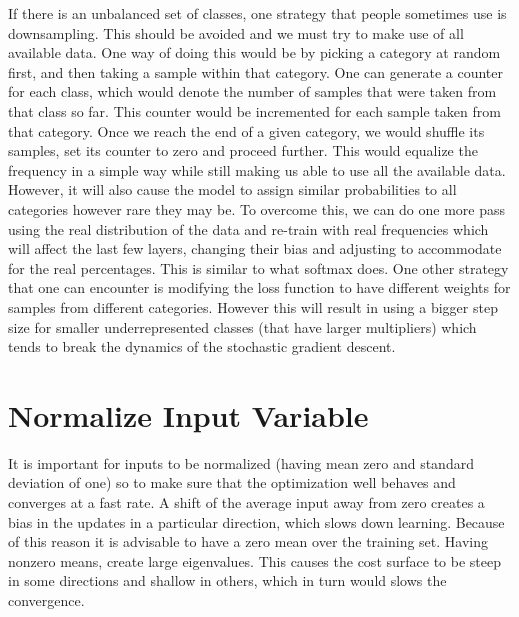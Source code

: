 If there is an unbalanced set of classes, one strategy that people sometimes use is downsampling. 
This should be avoided and we must try to make use of all available data. 
One way of doing this would be by picking a category at random first, and then taking a sample within that category. 
One can generate a counter for each class, which would denote the number of samples that were taken from that class so far. 
This counter would be incremented for each sample taken from that category. 
Once we reach the end of a given category, we would shuffle its samples, set its counter to zero and proceed further. 
This would equalize the frequency in a simple way while still making us able to use all the available data. 
However, it will also cause the model to assign similar probabilities to all categories however rare they may be.  
To overcome this, we can do one more pass using the real distribution of the data and re-train with real frequencies which will affect the last few layers, changing their bias and adjusting to accommodate for the real percentages. 
This is similar to what softmax does. One other strategy that one can encounter is modifying the loss function to have different weights for samples from different categories. 
However this will result in using a bigger step size for smaller underrepresented classes (that have larger multipliers) which tends to break the dynamics of the stochastic gradient descent.

{\centering{}\par}
\vspace{5pt}

\section{Normalize Input Variable} 
It is important for inputs to be normalized (having mean zero and standard deviation of one) so to make sure that the optimization well behaves and converges at a fast rate.
A shift of the average input away from zero creates a bias in the updates in a particular direction, which slows down learning. 
Because of this reason it is advisable to have a zero mean over the training set. 
Having nonzero means, create large eigenvalues. This causes the cost surface to be steep in some directions and shallow in others, which in turn would slows the convergence. 

